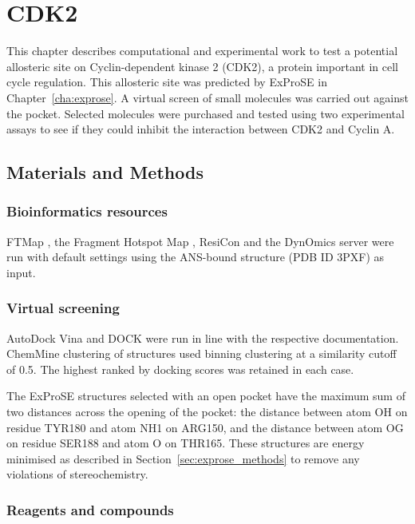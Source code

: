 \chapter{CDK2}
\label{cha:cdk2}

This chapter describes computational and experimental work to test a potential allosteric site on Cyclin-dependent kinase 2 (CDK2), a protein important in cell cycle regulation.
This allosteric site was predicted by ExProSE in Chapter~\ref{cha:exprose}.
A virtual screen of small molecules was carried out against the pocket.
Selected molecules were purchased and tested using two experimental assays to see if they could inhibit the interaction between CDK2 and Cyclin A.


\section{Materials and Methods}
\label{sec:cdk2_methods}


\subsection{Bioinformatics resources}

FTMap \cite{Kozakov2015}, the Fragment Hotspot Map \cite{Radoux2016}, ResiCon \cite{Dziubinski2016} and the DynOmics server \cite{Li2017} were run with default settings using the ANS-bound structure (PDB ID 3PXF) as input.


\subsection{Virtual screening}

AutoDock Vina and DOCK were run in line with the respective documentation.
ChemMine clustering of structures used binning clustering at a similarity cutoff of 0.5.
The highest ranked by docking scores was retained in each case.

The ExProSE structures selected with an open pocket have the maximum sum of two distances across the opening of the pocket: the distance between atom OH on residue TYR180 and atom NH1 on ARG150, and the distance between atom OG on residue SER188 and atom O on THR165.
These structures are energy minimised as described in Section~\ref{sec:exprose_methods} to remove any violations of stereochemistry.


\subsection{Reagents and compounds}

